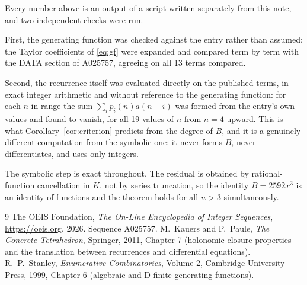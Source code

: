 \documentclass[11pt,a4paper]{article}
\theoremstyle{plain}
\theoremstyle{definition}
\begin{document}
Every number above is an output of a script written separately from this note, and two
independent checks were run.

First, the generating function was checked against the entry rather than assumed: the
Taylor coefficients of \eqref{eq:gf} were expanded and compared term by term with the DATA
section of A025757, agreeing on all 13 terms compared.

Second, the recurrence itself was evaluated directly on the published terms, in exact
integer arithmetic and without reference to the generating function: for each $n$ in range
the sum $\sum_{i}p_{i}(n)a(n-i)$ was formed from the entry's own values and found to
vanish, for all 19 values of $n$ from $n=4$ upward. This is what
Corollary~\ref{cor:criterion} predicts from the degree of $B$, and it is a genuinely
different computation from the symbolic one: it never forms $B$, never differentiates, and
uses only integers.

The symbolic step is exact throughout. The residual is obtained by rational-function
cancellation in $K$, not by series truncation, so the identity $B=2592 x^{3}$ is an
identity of functions and the theorem holds for all $n>3$ simultaneously.

\begin{thebibliography}{9}
 The OEIS Foundation, \emph{The On-Line Encyclopedia of Integer Sequences},
\url{https://oeis.org}, 2026. Sequence A025757.
 M.~Kauers and P.~Paule, \emph{The Concrete Tetrahedron}, Springer, 2011,
Chapter 7 (holonomic closure properties and the translation between recurrences and
differential equations).
 R.~P.~Stanley, \emph{Enumerative Combinatorics}, Volume 2, Cambridge
University Press, 1999, Chapter 6 (algebraic and D-finite generating functions).
\end{thebibliography}
\end{document}
